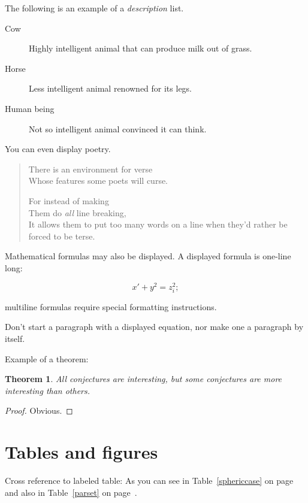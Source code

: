 \documentclass[aoas,preprint]{imsart}
\numberwithin{equation}{section}
\theoremstyle{plain}
\newtheorem{thm}{Theorem}[section]
\begin{document}
{The following is an example of a {\em description} list.
\begin{description}
\item[Cow] Highly intelligent animal that can produce milk out of grass.
\item[Horse] Less intelligent animal renowned for its legs.
\item[Human being] Not so intelligent animal convinced it can think.
\end{description}

You can even display poetry.
\begin{verse}
   There is an environment for verse \\    %
   Whose features some poets will curse.   %


   For instead of making\\
   Them do {\em all\/} line breaking, \\
   It allows them to put too many words on a line when they'd
   rather be forced to be terse.
\end{verse}

Mathematical formulas may also be displayed.  A displayed formula is
one-line long:

   \[  x' + y^{2} = z_{i}^{2};\]

multiline formulas require special formatting
instructions.

Don't start a paragraph with a displayed equation, nor make
one a paragraph by itself.

Example of a theorem:


\begin{thm}
All conjectures are interesting, but some conjectures are more
interesting than others.
\end{thm}

\begin{proof}
Obvious.
\end{proof}

\section{Tables and figures}
Cross reference to labeled table: As you can see in Table~\ref{sphericcase} on
page~\pageref{sphericcase} and also in Table~\ref{parset} on page~\pageref{parset}.


}
\end{document}
